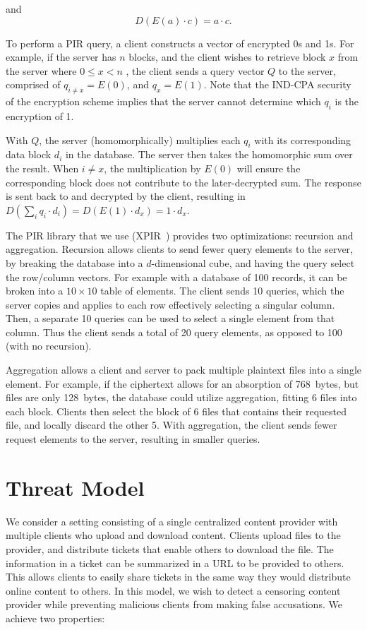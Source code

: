 \noindent and $$D(E(a)\cdot c)=a\cdot c.$$


To perform a PIR query, a client constructs a vector of encrypted 0s and 1s. For
example, if the server has $n$ blocks, and the client wishes to retrieve block $x$ 
from the server where  $0 \leq x < n$ , the client sends a query vector $Q$ to
the server, comprised of $q_{i \neq x} = E(0)$, and $q_x = E(1)$. Note
that the IND-CPA security of the encryption scheme implies that the server
cannot determine which $q_i$ is the encryption of 1.

With $Q$, the server (homomorphically) multiplies each $q_i$ with its
corresponding data block $d_i$ in the database. The server then takes the
homomorphic sum over the result. When $i \neq x$, the multiplication by $E(0)$
will ensure the corresponding block does not contribute to the later-decrypted
sum. The response is sent back to and decrypted by the client,
resulting in $D(\sum_i q_i\cdot d_i) = D(E(1)\cdot d_x) = 1 \cdot d_x$.

The PIR library that we use (XPIR~\cite{xpir}) provides two optimizations:
recursion and aggregation. Recursion allows
clients to send fewer query elements to the server, by breaking the database into
a $d$-dimensional cube, and having the query select the row/column vectors.
For example with a database of 100 records, it can be broken into a $10\times
10$ table of elements. The client sends 10 queries, which the server copies and
applies to each row effectively selecting a singular column. Then, a separate 10
queries can be used to select a single element from that column. Thus the client
sends a total of 20 query elements, as opposed to 100 (with no recursion).

Aggregation allows a client and server to pack multiple plaintext files into a
single element. For example, if the ciphertext allows for an absorption of
768~bytes, but files are only 128~bytes, the database could utilize aggregation,
fitting 6 files into each block. Clients then select the block of 6 files that
contains their requested file, and locally discard the other 5.
With aggregation, the client sends fewer request elements to the server, resulting in
smaller queries.


\section{Threat Model}

We consider a setting consisting of a single centralized content provider with
multiple clients who upload and download content.  Clients upload files to the
provider, and distribute tickets that enable others to download the file. The
information in a ticket can be summarized in a URL to be provided to others.
This allows clients to easily share tickets in the same way they would
distribute online content to others. In this model, we wish to detect a
censoring content provider while preventing malicious clients from making false
accusations. We achieve two properties:

